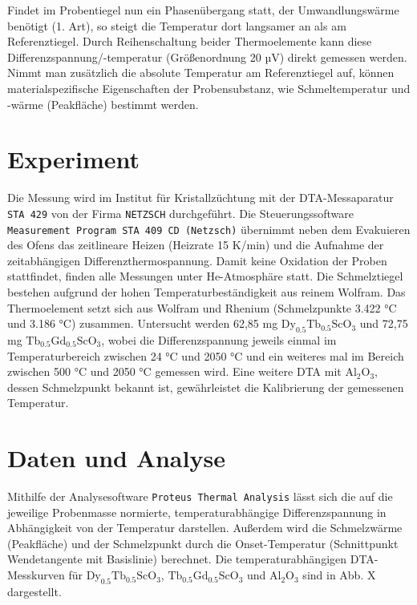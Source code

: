 \documentclass[aps,twocolumn,secnumarabic,nobalancelastpage,amsmath,amssymb,
nofootinbib,superscriptaddress]{revtex4-1}
\begin{document}
Findet im Probentiegel nun ein Phasenübergang statt, der Umwandlungswärme benötigt (1. Art), so steigt die Temperatur dort langsamer an als am Referenztiegel. Durch Reihenschaltung beider
Thermoelemente kann diese Differenzspannung/-temperatur (Größenordnung 20 $\text{µV}$) direkt gemessen werden. Nimmt man zusätzlich die absolute Temperatur am Referenztiegel auf, können materialspezifische Eigenschaften
der Probensubstanz, wie Schmeltemperatur und -wärme (Peakfläche) bestimmt werden.




\section{Experiment}
\noindent Die Messung wird im Institut für Kristallzüchtung mit der DTA-Messaparatur \texttt{STA 429} von der Firma \texttt{NETZSCH} durchgeführt. Die Steuerungssoftware
\texttt{Measurement Program STA 409 CD (Netzsch)} übernimmt neben dem Evakuieren des Ofens das zeitlineare Heizen (Heizrate 15 K/min) und die Aufnahme der zeitabhängigen Differenzthermospannung.
Damit keine Oxidation der Proben stattfindet, finden alle Messungen unter He-Atmosphäre statt. Die Schmelztiegel bestehen aufgrund der hohen
Temperaturbeständigkeit aus reinem Wolfram. Das Thermoelement setzt sich aus Wolfram und Rhenium (Schmelzpunkte 3.422 °C und 3.186 °C) zusammen.
Untersucht werden 62,85 mg $\text{Dy}_{0.5}\text{Tb}_{0.5}\text{ScO}_3$ und 72,75 mg $\text{Tb}_{0.5}\text{Gd}_{0.5}\text{ScO}_3$, wobei die Differenzspannung jeweils
einmal im Temperaturbereich zwischen 24 °C und 2050 °C und ein weiteres mal im Bereich zwischen 500 °C und 2050 °C gemessen wird. Eine weitere DTA
mit $\text{Al}_2\text{O}_3$, dessen Schmelzpunkt bekannt ist, gewährleistet die Kalibrierung der gemessenen Temperatur.



\section{Daten und Analyse}
\noindent Mithilfe der Analysesoftware \texttt{Proteus Thermal Analysis} lässt sich die auf die jeweilige Probenmasse normierte, temperaturabhängige Differenzspannung in
Abhängigkeit von der Temperatur darstellen. Außerdem wird die Schmelzwärme (Peakfläche) und der Schmelzpunkt durch die Onset-Temperatur (Schnittpunkt Wendetangente mit Basislinie) \cite{versuchsbeschr}
berechnet. Die temperaturabhängigen DTA-Messkurven für $\text{Dy}_{0.5}\text{Tb}_{0.5}\text{ScO}_3$, $\text{Tb}_{0.5}\text{Gd}_{0.5}\text{ScO}_3$ und $\text{Al}_{2}\text{O}_3$ sind in Abb. X dargestellt.
\end{document}
